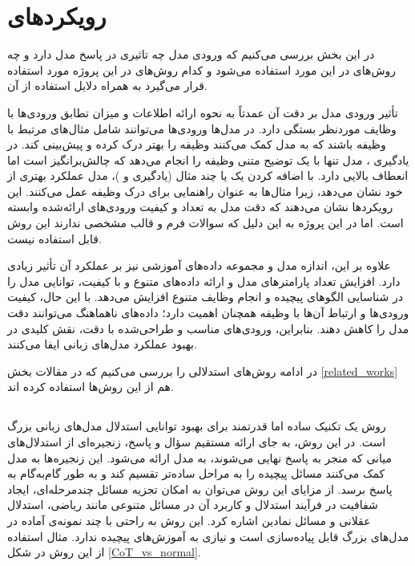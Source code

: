 \documentclass[11pt, a4paper, oneside]{book}
\begin{document}
		\section{رویکردهای }
		
			در این بخش بررسی می‌کنیم که ورودی مدل چه تاثیری در پاسخ مدل دارد و چه روش‌های در این مورد استفاده می‌شود و کدام روش‌های در این پروژه مورد استفاده قرار می‌گیرد به همراه دلایل استفاده از آن.
		
			تأثیر ورودی مدل بر دقت آن عمدتاً به نحوه ارائه اطلاعات و میزان تطابق ورودی‌ها با وظایف موردنظر بستگی دارد. در مدل‌ها ورودی‌ها می‌توانند شامل مثال‌های مرتبط با وظیفه باشند که به مدل کمک می‌کنند وظیفه را بهتر درک کرده و پیش‌بینی کند. در یادگیری ، مدل تنها با یک توضیح متنی وظیفه را انجام می‌دهد که چالش‌برانگیز است اما انعطاف بالایی دارد. با اضافه کردن یک یا چند مثال (یادگیری  و )، مدل عملکرد بهتری از خود نشان می‌دهد، زیرا مثال‌ها به عنوان راهنمایی برای درک وظیفه عمل می‌کنند. این رویکردها نشان می‌دهند که دقت مدل به تعداد و کیفیت ورودی‌های ارائه‌شده وابسته است.  \cite{brown_language_2020} \cite{wang_prompt_2024} اما در این پروژه به این دلیل که سوالات فرم و قالب مشخصی ندارند این روش قابل استفاده نیست.
			
			علاوه بر این، اندازه مدل و مجموعه داده‌های آموزشی نیز بر عملکرد آن تأثیر زیادی دارد. افزایش تعداد پارامترهای مدل و ارائه داده‌های متنوع و با کیفیت، توانایی مدل را در شناسایی الگوهای پیچیده و انجام وظایف متنوع افزایش می‌دهد. با این حال، کیفیت ورودی‌ها و ارتباط آن‌ها با وظیفه همچنان اهمیت دارد؛ داده‌های ناهماهنگ می‌توانند دقت مدل را کاهش دهند. بنابراین، ورودی‌های مناسب و طراحی‌شده با دقت، نقش کلیدی در بهبود عملکرد مدل‌های زبانی ایفا می‌کنند.
			
			در ادامه روش‌های استدلالی را بررسی می‌کنیم که در مقالات بخش \ref{related_works} هم از این روش‌ها استفاده کرده اند.
			
			\subsection{} \label{CoT}
			
				روش  یک تکنیک ساده اما قدرتمند برای بهبود توانایی استدلال مدل‌های زبانی بزرگ است. در این روش، به جای ارائه مستقیم سؤال و پاسخ، زنجیره‌ای از استدلال‌های میانی که منجر به پاسخ نهایی می‌شوند، به مدل ارائه می‌شود. این زنجیره‌ها به مدل کمک می‌کنند مسائل پیچیده را به مراحل ساده‌تر تقسیم کند و به طور گام‌به‌گام به پاسخ برسد. از مزایای این روش می‌توان به امکان تجزیه مسائل چندمرحله‌ای، ایجاد شفافیت در فرآیند استدلال و کاربرد آن در مسائل متنوعی مانند ریاضی، استدلال عقلانی و مسائل نمادین اشاره کرد. این روش به راحتی با چند نمونه‌ی آماده در مدل‌های بزرگ قابل پیاده‌سازی است و نیازی به آموزش‌های پیچیده ندارد. مثال استفاده از این روش در شکل \ref{CoT_vs_normal}.
				
\end{document}

